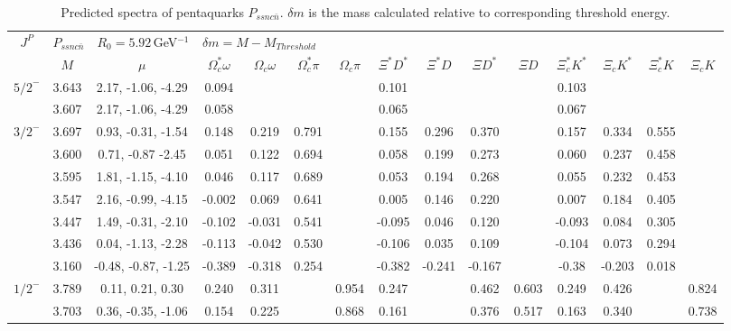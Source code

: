 \documentclass[prd,twocolumn,floatfix,nofootinbib]{revtex4}
\begin{document}
\renewcommand{\tabcolsep}{0.1cm}
\renewcommand{\arraystretch}{1.0}
\begin{table*}[!htbp]
    \caption{Predicted spectra of pentaquarks $P_{ssnc\bar{n}}$.
        $\delta m$ is the mass calculated relative to corresponding threshold energy.}
    \label{tab:ssncn}
    \begin{tabular}{c|cc|cccccccccccc}
        \bottomrule[1.5pt]\bottomrule[0.5pt]
        \multirow{2}{*}{$J^{P}$} 
        &\multicolumn{2}{l|}{$P_{ssnc\bar{n}}\quad R_{0}=5.92\,$GeV$^{-1}$}
        &\multicolumn{12}{l}{$\delta m=M-M_{Threshold}$} \\
        &$M$ &$\mu$ &$\Omega_{c}^{\ast}\omega$ &$\Omega_{c}\omega$ &$\Omega_{c}^{\ast}\pi$ &$\Omega_{c}\pi$
        &$\Xi^{\ast}D^{\ast}$ &$\Xi^{\ast}D$ &$\Xi D^{\ast}$ &$\Xi D$
        &$\Xi_{c}^{\ast}K^{\ast}$ &$\Xi_{c}K^{\ast}$ &$\Xi_{c}^{\ast}K$ &$\Xi_{c}K$ \\ \hline
            ${5/2}^{-}$     &3.643  &2.17, -1.06, -4.29 &0.094 & & & &0.101 & & & &0.103 & & & \\
                            &3.607  &2.17, -1.06, -4.29 &0.058 & & & &0.065 & & & &0.067 & & & \\
            ${3/2}^{-}$     &3.697  &0.93, -0.31, -1.54 &0.148 &0.219 &0.791 & &0.155 &0.296 &0.370 & &0.157 &0.334 &0.555 & \\
                            &3.600  &0.71, -0.87 -2.45 &0.051 &0.122 &0.694 & &0.058 &0.199 &0.273 & &0.060 &0.237 &0.458 & \\
                            &3.595  &1.81, -1.15, -4.10 &0.046 &0.117 &0.689 & &0.053 &0.194 &0.268 & &0.055 &0.232 &0.453 & \\
                            &3.547  &2.16, -0.99, -4.15 &-0.002 &0.069 &0.641 & &0.005 &0.146 &0.220 & &0.007 &0.184 &0.405 & \\
                            &3.447  &1.49, -0.31, -2.10 &-0.102 &-0.031 &0.541 & &-0.095 &0.046 &0.120 & &-0.093 &0.084 &0.305 & \\
                            &3.436  &0.04, -1.13, -2.28 &-0.113 &-0.042 &0.530 & &-0.106 &0.035 &0.109 & &-0.104 &0.073 &0.294 & \\
                            &3.160  &-0.48, -0.87, -1.25 &-0.389 &-0.318 &0.254 & &-0.382 &-0.241 &-0.167 & &-0.38 &-0.203 &0.018 & \\
            ${1/2}^{-}$     &3.789  &0.11, 0.21, 0.30 &0.240 &0.311 & &0.954 &0.247 & &0.462 &0.603 &0.249 &0.426 & &0.824 \\
                            &3.703  &0.36, -0.35, -1.06 &0.154 &0.225 & &0.868 &0.161 & &0.376 &0.517 &0.163 &0.340 & &0.738 \\

\end{tabular}
\end{table*}
\end{document}
